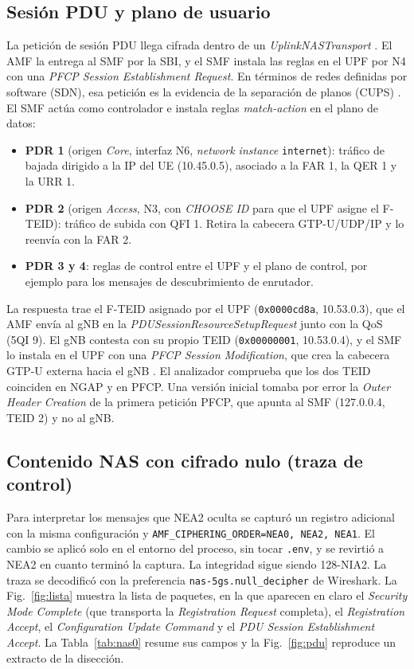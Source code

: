 \documentclass[conference]{IEEEtran}
\begin{document}
\subsection{Sesión PDU y plano de usuario}
La petición de sesión PDU llega cifrada dentro de un \textit{UplinkNASTransport} \cite{ts23502}. El AMF la entrega al SMF por la SBI, y el SMF instala las reglas en el UPF por N4 con una \textit{PFCP Session Establishment Request}. En términos de redes definidas por software (SDN), esa petición es la evidencia de la separación de planos (CUPS) \cite{ts29244}. El SMF actúa como controlador e instala reglas \textit{match-action} en el plano de datos:
\begin{itemize}
  \item \textbf{PDR 1} (origen \textit{Core}, interfaz N6, \textit{network instance} \texttt{internet}): tráfico de bajada dirigido a la IP del UE (10.45.0.5), asociado a la FAR 1, la QER 1 y la URR 1.
  \item \textbf{PDR 2} (origen \textit{Access}, N3, con \textit{CHOOSE ID} para que el UPF asigne el F-TEID): tráfico de subida con QFI 1. Retira la cabecera GTP-U/UDP/IP y lo reenvía con la FAR 2.
  \item \textbf{PDR 3 y 4}: reglas de control entre el UPF y el plano de control, por ejemplo para los mensajes de descubrimiento de enrutador.
\end{itemize}
La respuesta trae el F-TEID asignado por el UPF (\texttt{0x0000cd8a}, 10.53.0.3), que el AMF envía al gNB en la \textit{PDUSessionResourceSetupRequest} junto con la QoS (5QI 9). El gNB contesta con su propio TEID (\texttt{0x00000001}, 10.53.0.4), y el SMF lo instala en el UPF con una \textit{PFCP Session Modification}, que crea la cabecera GTP-U externa hacia el gNB \cite{ts29281}. El analizador comprueba que los dos TEID coinciden en NGAP y en PFCP. Una versión inicial tomaba por error la \textit{Outer Header Creation} de la primera petición PFCP, que apunta al SMF (127.0.0.4, TEID 2) y no al gNB.

\subsection{Contenido NAS con cifrado nulo (traza de control)}
\label{sec:nas0}
Para interpretar los mensajes que NEA2 oculta se capturó un registro adicional con la misma configuración y \texttt{AMF\_CIPHERING\_ORDER=NEA0, NEA2, NEA1}. El cambio se aplicó solo en el entorno del proceso, sin tocar \texttt{.env}, y se revirtió a NEA2 en cuanto terminó la captura. La integridad sigue siendo 128-NIA2. La traza se decodificó con la preferencia \texttt{nas-5gs.null\_decipher} de Wireshark. La Fig.~\ref{fig:lista} muestra la lista de paquetes, en la que aparecen en claro el \textit{Security Mode Complete} (que transporta la \textit{Registration Request} completa), el \textit{Registration Accept}, el \textit{Configuration Update Command} y el \textit{PDU Session Establishment Accept}. La Tabla~\ref{tab:nas0} resume sus campos y la Fig.~\ref{fig:pdu} reproduce un extracto de la disección.
\end{document}
